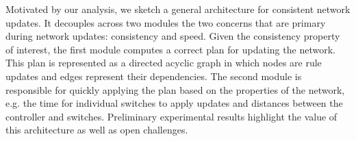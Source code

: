 Motivated by our analysis, we sketch a general architecture for consistent network updates. It decouples across two modules the two concerns that are primary during network updates: consistency and speed. Given the consistency property of interest, the first module computes a correct plan for updating the network. This plan is represented as a directed acyclic graph in which nodes are rule updates and edges represent their dependencies.  The second module is responsible for quickly applying the plan based on the properties of the network, e.g. the time for individual switches to apply updates and distances between the controller and switches. Preliminary experimental results highlight the value of this architecture as well as open challenges.
